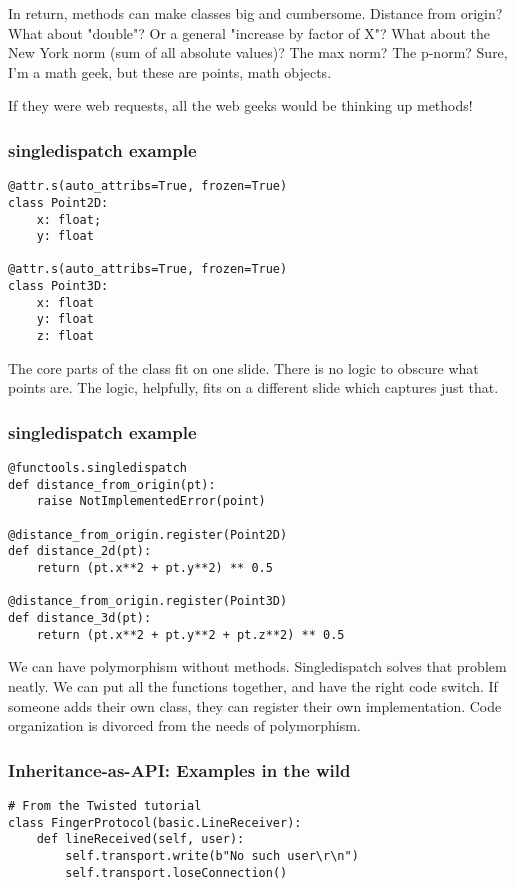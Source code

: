 In return,
methods can make classes big and cumbersome.
Distance from origin?
What about "double"?
Or a general "increase by factor of X"?
What about the New York norm
(sum of all absolute values)?
The max norm?
The p-norm?
Sure,
I'm a math geek,
but these are points,
math objects.

If they were web requests,
all the web geeks would be thinking up methods!

\begin{frame}[fragile]
\frametitle{singledispatch example}

\begin{lstlisting}
@attr.s(auto_attribs=True, frozen=True)
class Point2D:
    x: float;
    y: float

@attr.s(auto_attribs=True, frozen=True)
class Point3D:
    x: float
    y: float
    z: float
\end{lstlisting}

\end{frame}

The core parts of the class fit on one slide.
There is no logic to obscure what points are.
The logic,
helpfully,
fits on a different slide which captures just that.

\begin{frame}[fragile]
\frametitle{singledispatch example}

\begin{lstlisting}
@functools.singledispatch
def distance_from_origin(pt):
    raise NotImplementedError(point)

@distance_from_origin.register(Point2D)
def distance_2d(pt):
    return (pt.x**2 + pt.y**2) ** 0.5

@distance_from_origin.register(Point3D)
def distance_3d(pt):
    return (pt.x**2 + pt.y**2 + pt.z**2) ** 0.5
\end{lstlisting}

\end{frame}

We can have polymorphism without methods.
Singledispatch solves that problem neatly.
We can put all the functions together,
and have the right code switch.
If someone adds their own class,
they can register their own implementation.
Code organization is divorced from the needs
of polymorphism.

\begin{frame}[fragile]
\frametitle{Inheritance-as-API: Examples in the wild}

\begin{lstlisting}
# From the Twisted tutorial
class FingerProtocol(basic.LineReceiver):
    def lineReceived(self, user):
        self.transport.write(b"No such user\r\n")
        self.transport.loseConnection()
\end{lstlisting}

\end{frame}


